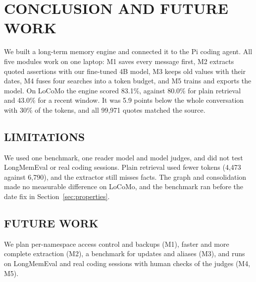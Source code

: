 \chapter{\uppercase{Conclusion and Future Work}}
\label{ch:conclusion}
We built a long-term memory engine and connected it to the Pi coding agent. All five modules
work on one laptop: M1 saves every message first, M2 extracts quoted assertions with our
fine-tuned 4B model, M3 keeps old values with their dates, M4 fuses four searches into a token
budget, and M5 trains and exports the model. On LoCoMo the engine scored 83.1\%, against 80.0\%
for plain retrieval and 43.0\% for a recent window. It was 5.9 points below the whole
conversation with 30\% of the tokens, and all 99,971 quotes matched the source.

\section{\uppercase{Limitations}}
We used one benchmark, one reader model and model judges, and did not test LongMemEval or real
coding sessions. Plain retrieval used fewer tokens (4,473 against 6,790), and the extractor
still misses facts. The graph and consolidation made no measurable difference on LoCoMo, and the
benchmark ran before the date fix in Section~\ref{sec:properties}.

\section{\uppercase{Future Work}}
We plan per-namespace access control and backups (M1), faster and more complete extraction
(M2), a benchmark for updates and aliases (M3), and runs on LongMemEval and real coding
sessions with human checks of the judges (M4, M5).
